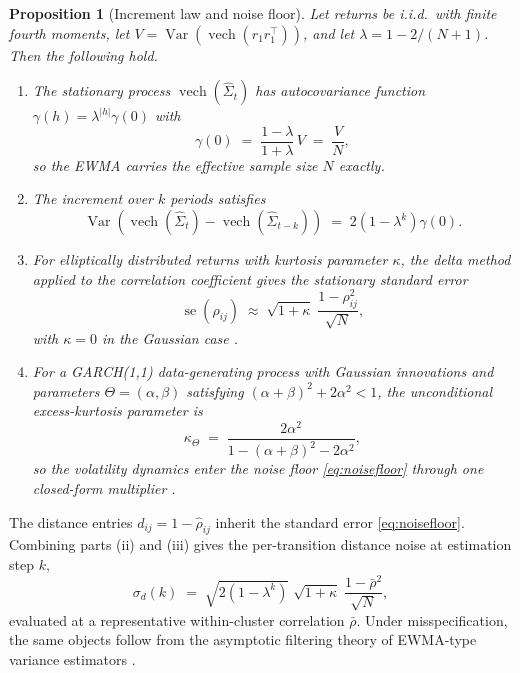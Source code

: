 \documentclass{rQUF2e}
\theoremstyle{plain}
\newtheorem{proposition}{Proposition}
\theoremstyle{remark}
\newcommand{\vech}{\operatorname{vech}}
\begin{document}
\begin{proposition}[Increment law and noise floor]
\label{prop:increments}
Let returns be i.i.d.\ with finite fourth moments, let
$V = \operatorname{Var}\!\left(\vech(r_1 r_1^{\top})\right)$, and let
$\lambda = 1 - 2/(N+1)$. Then the following hold.
\begin{enumerate}
\item[(i)] The stationary process $\vech(\widehat{\Sigma}_t)$ has
autocovariance function $\gamma(h) = \lambda^{|h|} \gamma(0)$ with
\begin{equation}
\gamma(0) \;=\; \frac{1-\lambda}{1+\lambda}\, V \;=\; \frac{V}{N},
\label{eq:statvar}
\end{equation}
so the EWMA carries the effective sample size $N$ exactly.
\item[(ii)] The increment over $k$ periods satisfies
\begin{equation}
\operatorname{Var}\!\left( \vech(\widehat{\Sigma}_t)
- \vech(\widehat{\Sigma}_{t-k}) \right)
\;=\; 2\left(1 - \lambda^{k}\right) \gamma(0).
\label{eq:kstep}
\end{equation}
\item[(iii)] For elliptically distributed returns with kurtosis parameter
$\kappa$, the delta method applied to the correlation coefficient gives the
stationary standard error
\begin{equation}
\operatorname{se}\!\left(\widehat{\rho}_{ij}\right)
\;\approx\; \sqrt{1+\kappa}\; \frac{1-\rho_{ij}^2}{\sqrt{N}},
\label{eq:noisefloor}
\end{equation}
with $\kappa = 0$ in the Gaussian case
\citep{neudecker1990asymptotic}.
\item[(iv)] For a GARCH(1,1) data-generating process with Gaussian innovations
and parameters $\Theta = (\alpha, \beta)$ satisfying
$(\alpha+\beta)^2 + 2\alpha^2 < 1$, the unconditional excess-kurtosis parameter
is
\begin{equation}
\kappa_{\Theta} \;=\; \frac{2\alpha^2}{1 - (\alpha+\beta)^2 - 2\alpha^2},
\label{eq:garchkappa}
\end{equation}
so the volatility dynamics enter the noise floor \eqref{eq:noisefloor} through
one closed-form multiplier \citep{bollerslev1986generalized}.
\end{enumerate}
\end{proposition}

The distance entries $d_{ij} = 1 - \widehat{\rho}_{ij}$ inherit the standard
error \eqref{eq:noisefloor}. Combining parts (ii) and (iii) gives the
per-transition distance noise at estimation step $k$,
\begin{equation}
\sigma_d(k) \;=\; \sqrt{2\left(1-\lambda^{k}\right)}\;
\sqrt{1+\kappa}\; \frac{1-\bar{\rho}^2}{\sqrt{N}},
\label{eq:transitionnoise}
\end{equation}
evaluated at a representative within-cluster correlation $\bar{\rho}$. Under
misspecification, the same objects follow from the asymptotic filtering theory
of EWMA-type variance estimators \citep{nelson1992filtering,
nelson1994asymptotic}.
\end{document}

